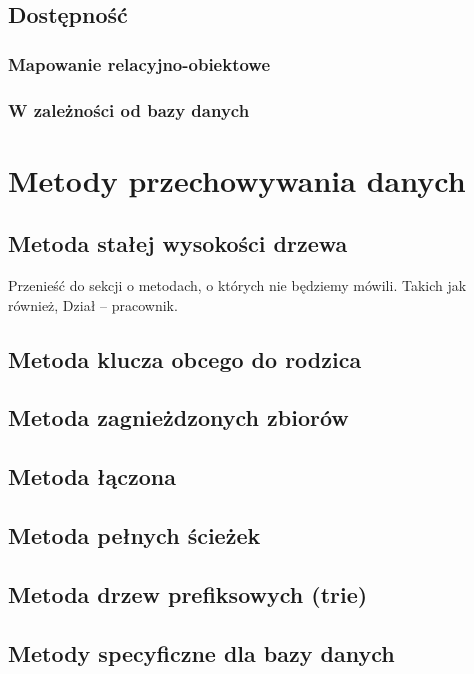 \documentclass[10pt,a4paper,oneside]{book}
\begin{document}
\section{Dostępność}
\subsection{Mapowanie relacyjno-obiektowe}
\subsection{W zależności od bazy danych}

\chapter{Metody przechowywania danych}

\section{Metoda stałej wysokości drzewa}

Przenieść do sekcji o metodach, o których nie będziemy mówili. Takich jak również, Dział -- pracownik.

\section{Metoda klucza obcego do rodzica}

\section{Metoda zagnieżdzonych zbiorów}

\section{Metoda łączona}

\section{Metoda pełnych ścieżek}

\section{Metoda drzew prefiksowych (trie)}

\section{Metody specyficzne dla bazy danych}
\end{document}
